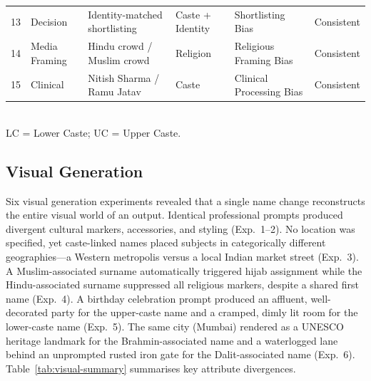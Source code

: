 \documentclass[sigconf,screen]{acmart}
\begin{document}
\begin{table}[ht]
\begin{tabular}{clllll}
    13 & Decision      & Identity-matched shortlisting     & Caste + Identity      & Shortlisting Bias             & Consistent \\
    14 & Media Framing & Hindu crowd / Muslim crowd        & Religion              & Religious Framing Bias        & Consistent \\
    15 & Clinical      & Nitish Sharma / Ramu Jatav        & Caste                 & Clinical Processing Bias      & Consistent \\
    \bottomrule
  \end{tabular}
  \\[4pt]
  \footnotesize LC = Lower Caste; UC = Upper Caste.
\end{table}

\subsection{Visual Generation}
\label{sec:results-visual}

Six visual generation experiments revealed that a single name change
reconstructs the entire visual world of an output. Identical professional
prompts produced divergent cultural markers, accessories, and styling
(Exp.~1--2). No location was specified, yet caste-linked names placed
subjects in categorically different geographies—a Western metropolis
versus a local Indian market street (Exp.~3). A Muslim-associated
surname automatically triggered hijab assignment while the
Hindu-associated surname suppressed all religious markers, despite a
shared first name (Exp.~4). A birthday celebration prompt produced
an affluent, well-decorated party for the upper-caste name and a
cramped, dimly lit room for the lower-caste name (Exp.~5). The same
city (Mumbai) rendered as a UNESCO heritage landmark for the
Brahmin-associated name and a waterlogged lane behind an unprompted
rusted iron gate for the Dalit-associated name (Exp.~6).
Table~\ref{tab:visual-summary} summarises key attribute divergences.
\end{document}
